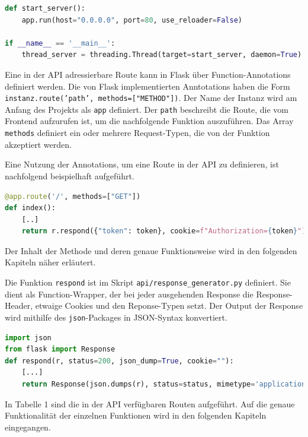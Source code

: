 \begin{lstlisting}[language=Python, caption={Flask im eigenen Thread starten}]
def start_server():
    app.run(host="0.0.0.0", port=80, use_reloader=False)

if __name__ == '__main__':
    thread_server = threading.Thread(target=start_server, daemon=True).start()
\end{lstlisting}

Eine in der API adressierbare Route kann in Flask über Function-Annotations definiert werden. Die von Flask implementierten Anntotations haben die Form \texttt{instanz.route('path', methods=["METHOD"])}. Der Name der Instanz wird am Anfang des Projekts als \texttt{app} definiert. Der \texttt{path} beschreibt die Route, die vom Frontend aufzurufen ist, um die nachfolgende Funktion auszuführen. Das Array \texttt{methods} definiert ein oder mehrere Request-Typen, die von der Funktion akzeptiert werden.

Eine Nutzung der Annotations, um eine Route in der API zu definieren, ist nachfolgend beispielhaft aufgeführt.

\begin{lstlisting}[language=Python, caption={Beispiel einer API-Routendefinition über Annotations}]
@app.route('/', methods=["GET"])
def index():
    [..]
    return r.respond({"token": token}, cookie=f"Authorization={token}")
\end{lstlisting}

Der Inhalt der Methode und deren genaue Funktionsweise wird in den folgenden Kapiteln näher erläutert.

Die Funktion \texttt{respond} ist im Skript \texttt{api/response\_{}generator.py} definiert. Sie dient als Function-Wrapper, der bei jeder ausgehenden Response die Response-Header, etwaige Cookies und den Reponse-Typen setzt. Der Output der Response wird mithilfe des \texttt{json}-Packages in JSON-Syntax konvertiert.

\begin{lstlisting}[language=Python, caption={Respond Funktion zur Rückgabe von JSON-Responses}]
import json
from flask import Response
def respond(r, status=200, json_dump=True, cookie=""):
    [...]
    return Response(json.dumps(r), status=status, mimetype='application/json', headers=headers)
\end{lstlisting}

In Tabelle 1 sind die in der API verfügbaren Routen aufgeführt. Auf die genaue Funktionalität der einzelnen Funktionen wird in den folgenden Kapiteln eingegangen.


